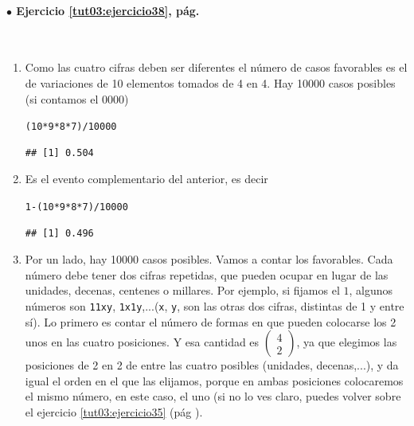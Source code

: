 \documentclass[10pt,a4paper]{article}\usepackage[]{graphicx}\usepackage[]{color}
\makeatletter
\newcommand{\hlnum}[1]{\textcolor[rgb]{0.686,0.059,0.569}{#1}}%
\newcommand{\hlopt}[1]{\textcolor[rgb]{0,0,0}{#1}}%
\newcommand{\hlstd}[1]{\textcolor[rgb]{0.345,0.345,0.345}{#1}}%
\newenvironment{kframe}{%
 \def\at@end@of@kframe{}%
 \ifinner\ifhmode%
  \def\at@end@of@kframe{\end{minipage}}%
  \begin{minipage}{\columnwidth}%
 \fi\fi%
 \def\FrameCommand##1{\hskip\@totalleftmargin \hskip-\fboxsep
 \colorbox{shadecolor}{##1}\hskip-\fboxsep
     \hskip-\linewidth \hskip-\@totalleftmargin \hskip\columnwidth}%
 \MakeFramed {\advance\hsize-\width
   \@totalleftmargin\z@ \linewidth\hsize
   \@setminipage}}%
 {\par\unskip\endMakeFramed%
 \at@end@of@kframe}
\newenvironment{knitrout}{}{} %
\newcounter {cont01}
\makeatother
\begin{document}
\paragraph{\bf $\bullet$ Ejercicio \ref{tut03:ejercicio38}, pág. \pageref{tut03:ejercicio38}}
\label{tut03:ejercicio38:sol}\quad\\
\begin{enumerate}
\item  Como las cuatro cifras deben ser diferentes el n\'umero de casos favorables es el de variaciones de 10 elementos tomados de 4 en 4. 
Hay 10000 casos posibles (si contamos el 0000)
\begin{knitrout}
\color{fgcolor}\begin{kframe}
\begin{alltt}
\hlstd{(}\hlnum{10}\hlopt{*}\hlnum{9}\hlopt{*}\hlnum{8}\hlopt{*}\hlnum{7}\hlstd{)}\hlopt{/}\hlnum{10000}
\end{alltt}
\begin{verbatim}
## [1] 0.504
\end{verbatim}
\end{kframe}
\end{knitrout}
\item Es el evento complementario del anterior, es decir 
\begin{knitrout}
\color{fgcolor}\begin{kframe}
\begin{alltt}
\hlnum{1}\hlopt{-}\hlstd{(}\hlnum{10}\hlopt{*}\hlnum{9}\hlopt{*}\hlnum{8}\hlopt{*}\hlnum{7}\hlstd{)}\hlopt{/}\hlnum{10000}
\end{alltt}
\begin{verbatim}
## [1] 0.496
\end{verbatim}
\end{kframe}
\end{knitrout}
\item Por un lado, hay 10000 casos posibles. Vamos a contar los favorables. Cada n\'umero debe tener dos cifras repetidas, que pueden ocupar en lugar de las unidades, decenas, centenes o millares. Por ejemplo, si fijamos el $1$, algunos n\'umeros son {\tt 11xy}, {\tt 1x1y},...({\tt x}, {\tt y}, son las otras dos cifras, distintas de 1 y entre sí). Lo primero es contar el n\'umero de formas en que pueden colocarse los 2 unos en las cuatro posiciones. Y esa cantidad es 
 $\left(\begin{array}{c} 4 \\ 2 \end{array} \right)$, ya que elegimos las posiciones de 2 en 2 de entre las cuatro posibles (unidades, decenas,...), y da igual el orden en el que las elijamos, porque en ambas posiciones colocaremos el mismo número, en este caso, el uno (si no lo ves claro, puedes volver sobre el ejercicio \ref{tut03:ejercicio35} (pág  \pageref{tut03:ejercicio35}). 

\end{enumerate}
\end{document}
